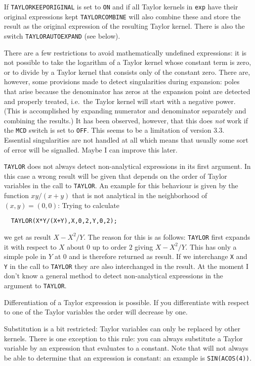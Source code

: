 If \verb|TAYLORKEEPORIGINAL| is set to \verb|ON| and if all Taylor
kernels in \verb|exp| have their original expressions kept
\verb|TAYLORCOMBINE| will also combine these and store the result
as the original expression of the resulting Taylor kernel.
There is also the switch \verb|TAYLORAUTOEXPAND| (see below).

There are a few restrictions to avoid mathematically undefined 
expressions:
it is not possible to take the logarithm of a Taylor kernel whose 
constant
term is zero, or to divide by a Taylor kernel that consists only 
of the constant zero.
There are, however, some provisions made to detect singularities during
expansion: poles that arise because the denominator has zeros at
the expansion point are
detected and properly treated, i.e.\ the Taylor kernel will
start with a negative power.  (This is accomplished by expanding
numerator and denominator separately and combining the results.)
It has been observed, however, that this does {\em not\/} work if the
\verb|MCD| switch is set to \verb|OFF|.  This seems to be a
limitation of \REDUCE{} version 3.3.
Essential singularities are not handled at all which means that usually
some sort of error will be signalled. Maybe I can improve this later.

\verb|TAYLOR| does not always detect non-analytical expressions in
its first argument.
In this case a wrong result will be given that depends on the order
of Taylor variables in the call to \verb|TAYLOR|.
An example for this behaviour is given by the function $xy/(x+y)$ that is
not analytical in the neighborhood of $(x,y) = (0,0)$:
Trying to calculate
\begin{verbatim}
  TAYLOR(X*Y/(X+Y),X,0,2,Y,0,2);
\end{verbatim}
we get as result $X-X^{2}/Y$.
The reason for this is as follows:
\verb|TAYLOR| first expands it with respect to $X$ about $0$
up to order $2$ giving $X - X^{2}/Y$.
This has only a simple pole in $Y$ at $0$ and is therefore returned as
result.
If we interchange \verb|X| and \verb|Y| in the call to \verb|TAYLOR|
they are also interchanged in the result.
At the moment I don't know a general method to detect non-analytical
expressions in the argument to \verb|TAYLOR|.

Differentiation of a Taylor expression is possible.  If you
differentiate with respect to one of the Taylor variables the order
will decrease by one. 

Substitution is a bit restricted: Taylor variables can only be replaced
by other kernels.  There is one exception to this rule: you can always
substitute a Taylor variable by an expression that evaluates to a
constant.  Note that \REDUCE{} will not always be able to determine
that an expression is constant:  an example is \verb|SIN(ACOS(4))|.

